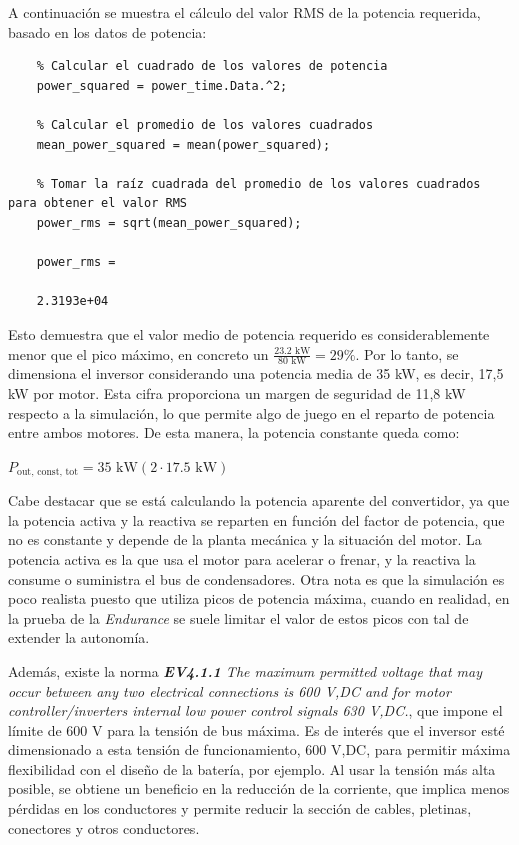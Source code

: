 A continuación se muestra el cálculo del valor RMS de la potencia requerida, basado en los datos de potencia:

\begin{verbatim}
	% Calcular el cuadrado de los valores de potencia
	power_squared = power_time.Data.^2;
	
	% Calcular el promedio de los valores cuadrados
	mean_power_squared = mean(power_squared);
	
	% Tomar la raíz cuadrada del promedio de los valores cuadrados para obtener el valor RMS
	power_rms = sqrt(mean_power_squared);
	
	power_rms =
	
	2.3193e+04
\end{verbatim}


Esto demuestra que el valor medio de potencia requerido es considerablemente menor que el pico máximo, en concreto un \(\frac{23.2 \text{ kW}}{80 \text{ kW}} = 29\%\). Por lo tanto, se dimensiona el inversor considerando una potencia media de 35 kW, es decir, 17,5 kW por motor. Esta cifra proporciona un margen de seguridad de 11,8 kW respecto a la simulación, lo que permite algo de juego en el reparto de potencia entre ambos motores. De esta manera, la potencia constante queda como:

\(P_{\text{out, const, tot}} = 35 \text{ kW} (2 \cdot 17.5 \text{ kW})\)

Cabe destacar que se está calculando la potencia aparente del convertidor, ya que la potencia activa y la reactiva se reparten en función del factor de potencia, que no es constante y depende de la planta mecánica y la situación del motor. La potencia activa es la que usa el motor para acelerar o frenar, y la reactiva la consume o suministra el bus de condensadores. Otra nota es que la simulación es poco realista puesto que utiliza picos de potencia máxima, cuando en realidad, en la prueba de la \textit{Endurance} se suele limitar el valor de estos picos con tal de extender la autonomía.

Además, existe la norma \textit{\textbf{EV4.1.1} The maximum permitted voltage that may occur between any two electrical connections is 600 V,DC and for motor controller/inverters internal low power control signals 630 V,DC.}, que impone el límite de 600 V para la tensión de bus máxima. Es de interés que el inversor esté dimensionado a esta tensión de funcionamiento, 600 V,DC, para permitir máxima flexibilidad con el diseño de la batería, por ejemplo. Al usar la tensión más alta posible, se obtiene un beneficio en la reducción de la corriente, que implica menos pérdidas en los conductores y permite reducir la sección de cables, pletinas, conectores y otros conductores.

